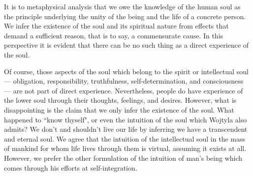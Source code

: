 \begin{quotex}
It is to metaphysical analysis that we owe the knowledge of the human soul as the principle underlying the unity of the being and the life of a concrete person. We infer the existence of the soul and its spiritual nature from effects that demand a sufficient reason, that is to say, a commensurate cause. In this perspective it is evident that there can be no such thing as a direct experience of the soul.

\end{quotex}
Of course, those aspects of the soul which belong to the spirit or intellectual soul — obligation, responsibility, truthfulness, self-determination, and consciousness — are not part of direct experience. Nevertheless, people do have experience of the lower soul through their thoughts, feelings, and desires. However, what is disappointing is the claim that we only infer the existence of the soul. What happened to ``know thyself", or even the intuition of the soul which Wojtyla also admits? We don't and shouldn't live our life by inferring we have a transcendent and eternal soul. We agree that the intuition of the intellectual soul in the mass of mankind for whom life lives through them is virtual, assuming it exists at all. However, we prefer the other formulation of the intuition of man's being which comes through his efforts at self-integration.




